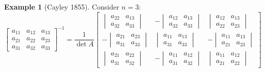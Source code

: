 \documentclass[a4paper,landscape,twocolumn]{article}
\theoremstyle{definition}
\newtheorem{ex}{Example}
\begin{document}
\begin{ex}[Cayley 1855]
  Consider $n=3$:
  \[
    \begin{bmatrix}
      a_{11} & a_{12} & a_{13} \\
      a_{21} & a_{22} & a_{23} \\
      a_{31} & a_{32} & a_{33}
    \end{bmatrix}^{-1}
    = \frac{1}{\det{A}}
    \begin{bmatrix}
      \begin{vmatrix}
        a_{22} & a_{13} \\
        a_{32} & a_{33}
      \end{vmatrix} &
      - \begin{vmatrix}
        a_{12} & a_{13} \\
        a_{32} & a_{33}
      \end{vmatrix} &
      \begin{vmatrix}
        a_{12} & a_{13} \\
        a_{22} & a_{23}
      \end{vmatrix} \\
      - \begin{vmatrix}
        a_{21} & a_{23} \\
        a_{31} & a_{33}
      \end{vmatrix} &
      \begin{vmatrix}
        a_{11} & a_{13} \\
        a_{31} & a_{33}
      \end{vmatrix} &
      -\begin{vmatrix}
        a_{11} & a_{13} \\
        a_{21} & a_{23}
      \end{vmatrix} \\
      \begin{vmatrix}
        a_{21} & a_{22} \\
        a_{31} & a_{32}
      \end{vmatrix} &
      - \begin{vmatrix}
        a_{11} & a_{12} \\
        a_{31} & a_{32}
      \end{vmatrix} &
      \begin{vmatrix}
        a_{11} & a_{12} \\
        a_{21} & a_{22}
      \end{vmatrix}
    \end{bmatrix}
  \]
\end{ex}
\end{document}
